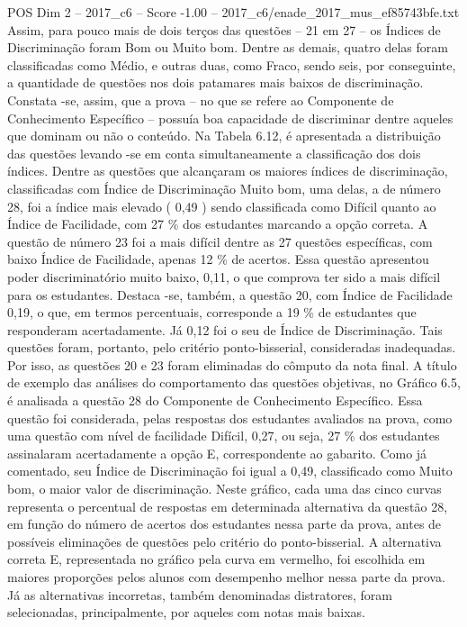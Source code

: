 \begin{textsample}{POS Dim 2 – 2017\_c6 – Score -1.00 – 2017\_c6/enade\_2017\_mus\_ef85743bfe.txt}
Assim, para pouco mais de dois terços das questões – 21 em 27 – os Índices de Discriminação foram Bom ou Muito bom.
Dentre as demais, quatro delas foram classificadas como Médio, e outras duas, como Fraco, sendo seis, por conseguinte, a quantidade de questões nos dois patamares mais baixos de discriminação.
Constata -se, assim, que a prova – no que se refere ao Componente de Conhecimento Específico – possuía boa capacidade de discriminar dentre aqueles que dominam ou não o conteúdo.
Na Tabela 6.12, é apresentada a distribuição das questões levando -se em conta simultaneamente a classificação dos dois índices.
Dentre as questões que alcançaram os maiores índices de discriminação, classificadas com Índice de Discriminação Muito bom, uma delas, a de número 28, foi a índice mais elevado ( 0,49 ) sendo classificada como Difícil quanto ao Índice de Facilidade, com 27 \% dos estudantes marcando a opção correta.
A questão de número 23 foi a mais difícil dentre as 27 questões específicas, com baixo Índice de Facilidade, apenas 12 \% de acertos.
Essa questão apresentou poder discriminatório muito baixo, 0,11, o que comprova ter sido a mais difícil para os estudantes.
Destaca -se, também, a questão 20, com Índice de Facilidade 0,19, o que, em termos percentuais, corresponde a 19 \% de estudantes que responderam acertadamente.
Já 0,12 foi o seu de Índice de Discriminação.
Tais questões foram, portanto, pelo critério ponto-bisserial, consideradas inadequadas.
Por isso, as questões 20 e 23 foram eliminadas do cômputo da nota final.
A título de exemplo das análises do comportamento das questões objetivas, no Gráfico 6.5, é analisada a questão 28 do Componente de Conhecimento Específico.
Essa questão foi considerada, pelas respostas dos estudantes avaliados na prova, como uma questão com nível de facilidade Difícil, 0,27, ou seja, 27 \% dos estudantes assinalaram acertadamente a opção E, correspondente ao gabarito.
Como já comentado, seu Índice de Discriminação foi igual a 0,49, classificado como Muito bom, o maior valor de discriminação.
Neste gráfico, cada uma das cinco curvas representa o percentual de respostas em determinada alternativa da questão 28, em função do número de acertos dos estudantes nessa parte da prova, antes de possíveis eliminações de questões pelo critério do ponto-bisserial.
A alternativa correta E, representada no gráfico pela curva em vermelho, foi escolhida em maiores proporções pelos alunos com desempenho melhor nessa parte da prova.
Já as alternativas incorretas, também denominadas distratores, foram selecionadas, principalmente, por aqueles com notas mais baixas.

\end{textsample}
